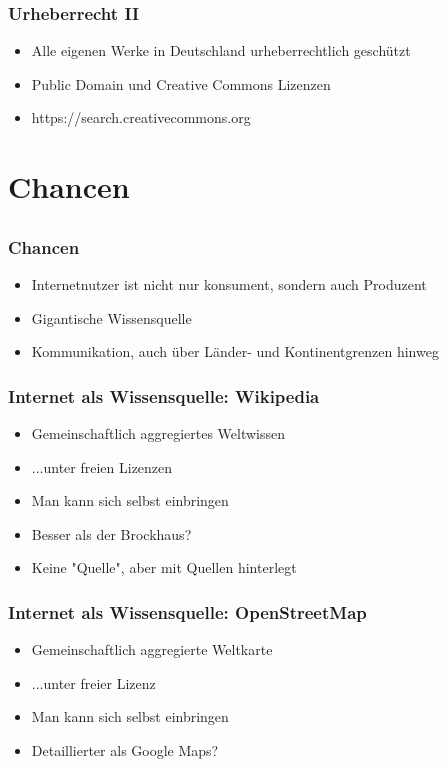 \documentclass[12pt]{beamer}
\begin{document}
\begin{frame}
  \frametitle{Urheberrecht II}
  \begin{itemize}
    \item<2-> Alle eigenen Werke in Deutschland urheberrechtlich geschützt
    \item<3-> Public Domain und Creative Commons Lizenzen
    \item<4-> https://search.creativecommons.org
  \end{itemize}
\end{frame}

\section{Chancen}
\subsection{}

\begin{frame}
  \frametitle{Chancen}
  \begin{itemize}
    \item<2-> Internetnutzer ist nicht nur konsument, sondern auch Produzent
    \item<3-> Gigantische Wissensquelle
    \item<4-> Kommunikation, auch über Länder- und Kontinentgrenzen hinweg
  \end{itemize}
\end{frame}

\begin{frame}
  \frametitle{Internet als Wissensquelle: Wikipedia}
  \begin{itemize}
    \item<2-> Gemeinschaftlich aggregiertes Weltwissen
    \item<3-> ...unter freien Lizenzen
    \item<4-> Man kann sich selbst einbringen
    \item<5-> Besser als der Brockhaus?
    \item<6-> Keine "Quelle", aber mit Quellen hinterlegt
  \end{itemize}
\end{frame}

\begin{frame}
  \frametitle{Internet als Wissensquelle: OpenStreetMap}
  \begin{itemize}
    \item<2-> Gemeinschaftlich aggregierte Weltkarte
    \item<3-> ...unter freier Lizenz
    \item<4-> Man kann sich selbst einbringen
    \item<5-> Detaillierter als Google Maps?
  \end{itemize}
\end{frame}
\end{document}
